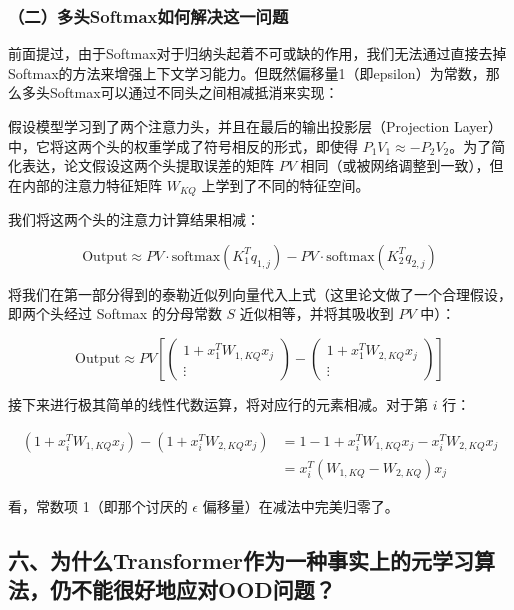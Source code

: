 \hypertarget{ux4e8cux591aux5934softmaxux5982ux4f55ux89e3ux51b3ux8fd9ux4e00ux95eeux9898}{%
\subsubsection{（二）多头Softmax如何解决这一问题}\label{ux4e8cux591aux5934softmaxux5982ux4f55ux89e3ux51b3ux8fd9ux4e00ux95eeux9898}}

前面提过，由于Softmax对于归纳头起着不可或缺的作用，我们无法通过直接去掉Softmax的方法来增强上下文学习能力。但既然偏移量1（即epsilon）为常数，那么多头Softmax可以通过不同头之间相减抵消来实现：

假设模型学习到了两个注意力头，并且在最后的输出投影层（Projection Layer）中，它将这两个头的权重学成了符号相反的形式，即使得 \(P_1V_1 \approx -P_2V_2\)。为了简化表达，论文假设这两个头提取误差的矩阵 \(PV\) 相同（或被网络调整到一致），但在内部的注意力特征矩阵 \(W_{KQ}\) 上学到了不同的特征空间。

我们将这两个头的注意力计算结果相减：

\[
\mathrm{Output} \approx PV \cdot \mathrm{softmax}(K_1^Tq_{1,j}) - PV \cdot \mathrm{softmax}(K_2^Tq_{2,j})
\]

将我们在第一部分得到的泰勒近似列向量代入上式（这里论文做了一个合理假设，即两个头经过 Softmax 的分母常数 \(S\) 近似相等，并将其吸收到 \(PV\) 中）：

\[
\mathrm{Output} \approx PV \left[
\begin{pmatrix}
1+x_1^TW_{1,KQ}x_j \\
\vdots
\end{pmatrix} - \begin{pmatrix}
1+x_1^TW_{2,KQ}x_j \\
\vdots
\end{pmatrix}
\right]
\]

接下来进行极其简单的线性代数运算，将对应行的元素相减。对于第 \(i\) 行：

\[
\begin{aligned}
(1+x_i^TW_{1,KQ}x_j)-(1+x_i^TW_{2,KQ}x_j)
&= 1-1+x_i^TW_{1,KQ}x_j-x_i^TW_{2,KQ}x_j \\
&= x_i^T(W_{1,KQ}-W_{2,KQ})x_j
\end{aligned}
\]

看，常数项 1（即那个讨厌的 \(\epsilon\) 偏移量）在减法中完美归零了。

\hypertarget{ux516dux4e3aux4ec0ux4e48transformerux4f5cux4e3aux4e00ux79cdux4e8bux5b9eux4e0aux7684ux5143ux5b66ux4e60ux7b97ux6cd5ux4ecdux4e0dux80fdux5f88ux597dux5730ux5e94ux5bf9oodux95eeux9898}{%
\subsection{六、为什么Transformer作为一种事实上的元学习算法，仍不能很好地应对OOD问题？}\label{ux516dux4e3aux4ec0ux4e48transformerux4f5cux4e3aux4e00ux79cdux4e8bux5b9eux4e0aux7684ux5143ux5b66ux4e60ux7b97ux6cd5ux4ecdux4e0dux80fdux5f88ux597dux5730ux5e94ux5bf9oodux95eeux9898}}

